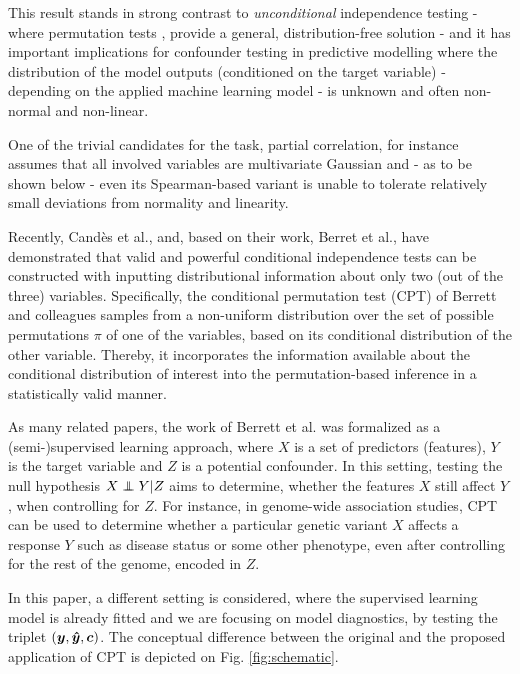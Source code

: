 \documentclass{article}
\begin{document}
This result stands in strong contrast to \emph{unconditional} independence testing - where permutation tests \citep{pitman1937significance, fisher1942189}, provide a general, distribution-free solution - and it has important implications for confounder testing in predictive modelling where the distribution of the model outputs (conditioned on the target variable) - depending on the applied machine learning model - is unknown and often non-normal and non-linear.

One of the trivial candidates for the task, partial correlation, for instance assumes that all involved variables are multivariate Gaussian and - as to be shown below - even its Spearman-based variant is unable to tolerate relatively small deviations from normality and linearity.

Recently, Cand\`es et al.\cite{candes2016panning}, and, based on their work, Berret et al.\cite{berrett2020conditional}, have demonstrated that valid and powerful conditional independence tests can be constructed with inputting distributional information about only two (out of the three) variables.
Specifically, the conditional permutation test (CPT) of Berrett and colleagues samples from a non-uniform distribution over the set of possible permutations $\pi$ of one of the variables, based on its conditional distribution of the other variable. Thereby, it incorporates the information available about the conditional distribution of interest into the permutation-based inference in a statistically valid manner.

As many related papers, the work of Berrett et al. was formalized as a (semi-)supervised learning approach, where $X$ is a set of predictors (features), $Y$ is the target variable and $Z$ is a potential confounder. In this setting, testing the null hypothesis $X \independent Y | Z$ aims to determine, whether the features $X$ still affect $Y$, when controlling for $Z$.
For instance, in genome-wide association studies, CPT can be used to determine whether a particular genetic variant $X$ affects a response $Y$ such as disease status or some other phenotype, even after controlling for the rest of the genome, encoded in $Z$.

In this paper, a different setting is considered, where the supervised learning model is already fitted and we are focusing on model diagnostics, by testing the triplet $(\boldsymbol{y},\boldsymbol{\hat{y}}, \boldsymbol{c})$. 
The conceptual difference between the original and the proposed application of CPT is depicted on Fig. \ref{fig:schematic}.
\end{document}
